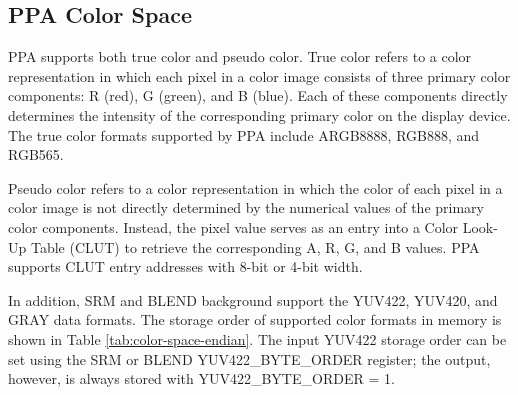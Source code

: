 \documentclass[main\_\_EN.tex]{subfiles}
\begin{document}
\subsection{PPA Color Space}

PPA supports both true color and pseudo color. True color refers to a color representation in which each pixel in a color image consists of three primary color components: R (red), G (green), and B (blue). Each of these components directly determines the intensity of the corresponding primary color on the display device. The true color formats supported by PPA include ARGB8888, RGB888, and RGB565.

Pseudo color refers to a color representation in which the color of each pixel in a color image is not directly determined by the numerical values of the primary color components. Instead, the pixel value serves as an entry into a Color Look-Up Table (CLUT) to retrieve the corresponding A, R, G, and B values. PPA supports CLUT entry addresses with 8-bit or 4-bit width.

In addition, SRM and BLEND background support the YUV422, YUV420, and GRAY data formats. The storage order of supported color formats in memory is shown in Table \ref{tab:color-space-endian}. The input YUV422 storage order can be set using the SRM or BLEND YUV422\_BYTE\_ORDER register; the output, however, is always stored with YUV422\_BYTE\_ORDER = 1.
\end{document}
